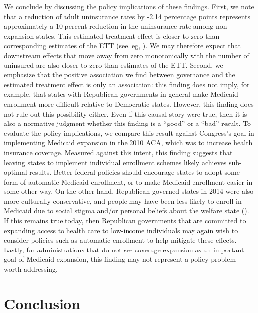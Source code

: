 \documentclass[12pt]{article}
\begin{document}
We conclude by discussing the policy implications of these findings. First, we note that a reduction of adult uninsurance rates by -2.14 percentage points represents approximately a 10 percent reduction in the uninsurance rate among non-expansion states. This estimated treatment effect is closer to zero than corresponding estimates of the ETT (see, eg, \cite{courtemanche2017early}). We may therefore expect that downstream effects that move away from zero monotonically with the number of uninsured are also closer to zero than estimates of the ETT. Second, we emphasize that the positive association we find between governance and the estimated treatment effect is only an association: this finding does not imply, for example, that states with Republican governments in general make Medicaid enrollment more difficult relative to Democratic states. However, this finding does not rule out this possibility either. Even if this causal story were true, then it is also a normative judgment whether this finding is a ``good'' or a ``bad'' result. To evaluate the policy implications, we compare this result against Congress's goal in implementing Medicaid expansion in the 2010 ACA, which was to increase health insurance coverage. Measured against this intent, this finding suggests that leaving states to implement individual enrollment schemes likely achieves sub-optimal results. Better federal policies should encourage states to adopt some form of automatic Medicaid enrollment, or to make Medicaid enrollment easier in some other way. On the other hand, Republican governed states in 2014 were also more culturally conservative, and people may have been less likely to enroll in Medicaid due to social stigma and/or personal beliefs about the welfare state (\cite{sommers2012understanding}). If this remains true today, then Republican governments that are committed to expanding access to health care to low-income individuals may again wish to consider policies such as automatic enrollment to help mitigate these effects. Lastly, for administrations that do not see coverage expansion as an important goal of Medicaid expansion, this finding may not represent a policy problem worth addressing.

\section{Conclusion}
\end{document}
